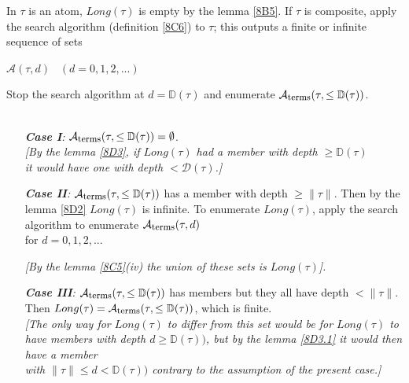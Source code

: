 \documentclass[a4paper,10pt]{article}
\begin{document}
\begin{mydef}\label{8D5} In $\tau$ is an atom, $Long(\tau)$ is empty by the lemma \ref{8B5}. If $\tau$ is
composite, apply the search algorithm (definition \ref{8C6}) to $\tau$; this outputs a finite or infinite sequence of sets
\begin{center}
 $\mathcal{A}(\tau,d) \,\,\,\,\, (d = 0, 1, 2, ...)$
\end{center}

Stop the search algorithm at $d = \mathbb{D}(\tau)$ and enumerate $\mathcal{A}_{\mbox{\footnotesize terms}}(\tau, \leq \mathbb{D}(\tau))$.\\

\\

\begin{itemize}
 \item[{\em \textbf{Case I}:}] $\mathcal{A}_{\mbox{\footnotesize terms}}(\tau, \leq \mathbb{D}(\tau)) = \emptyset$.\\
 
{\em [By the lemma \ref{8D3}, if $Long(\tau)$ had a member with depth $\geq \mathbb{D}(\tau)$\\ 
it would have one with depth $< \mathcal{D}(\tau)$.]} 
 
 \item[{\em \textbf{Case II}:}] $\mathcal{A}_{\mbox{\footnotesize terms}}(\tau, \leq \mathbb{D}(\tau))$ has a member with depth $\geq \rVert\tau\rVert$.
 Then by the lemma \ref{8D2} $Long(\tau)$ is infinite. To enumerate $Long(\tau)$, apply the search algorithm to enumerate $\mathcal{A}_{\mbox{\footnotesize terms}}(\tau, d)$\\
 for $d = 0, 1, 2, ..$.

 {\em [By the lemma \ref{8C5}(iv) the union of these sets is $Long(\tau)$].}
 
 \item[{\em \textbf{Case III}:}] $\mathcal{A}_{\mbox{\footnotesize terms}}(\tau, \leq \mathbb{D}(\tau))$ has members but they all have depth $< \rVert\tau\rVert$. 
 Then $Long(\tau) = \mathcal{A}_{\mbox{\footnotesize terms}}(\tau, \leq \mathbb{D}(\tau))$, which is finite.\\
 
{\em [The only way for $Long(\tau)$ to differ from this set would be for $Long(\tau)$ to \\
 have members with depth $d \geq \mathbb{D}(\tau))$, but by the lemma \ref{8D3.1} it would then have a member\\ 
 with $\rVert\tau\rVert \leq d < \mathbb{D}(\tau))$ contrary to the assumption of the present case.]}
 
\end{itemize}
\end{mydef}
\end{document}
